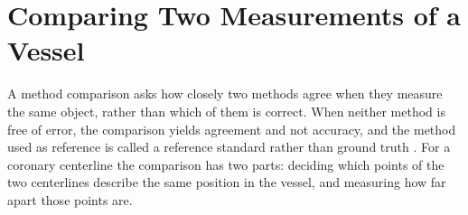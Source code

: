 
\section{Comparing Two Measurements of a Vessel}
\label{sec:tech-agreement}

A method comparison asks how closely two methods agree when they measure the same object, rather than which of them is correct.
When neither method is free of error, the comparison yields agreement and not accuracy, and the method used as reference is called a reference standard rather than ground truth \cite{schaap2009cat08}.
For a coronary centerline the comparison has two parts: deciding which points of the two centerlines describe the same position in the vessel, and measuring how far apart those points are.

